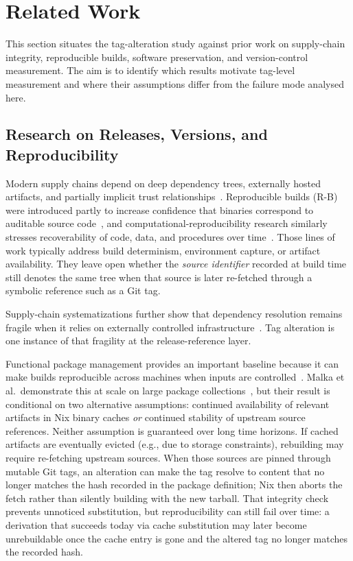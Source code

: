 \section{Related Work}
\label{sec:tags-related}

This section situates the tag-alteration study against prior work on supply-chain integrity, reproducible builds, software preservation, and version-control measurement.
The aim is to identify which results motivate tag-level measurement and where their assumptions differ from the failure mode analysed here.

\subsection{Research on Releases, Versions, and Reproducibility}
\label{subsec:tags-rw-releases}

Modern supply chains depend on deep dependency trees, externally hosted artifacts, and partially implicit trust relationships~\cite{ladisa2023supplychain, DBLP:journals/software/LambZ22, 10.1145/3641525.3663622}.
Reproducible builds (R-B) were introduced partly to increase confidence that binaries correspond to auditable source code~\cite{DBLP:journals/software/LambZ22}, and computational-reproducibility research similarly stresses recoverability of code, data, and procedures over time~\cite{881708, DBLP:journals/corr/abs-2011-10098, DBLP:journals/jodl/AustinBDKMNRSTV17}.
Those lines of work typically address build determinism, environment capture, or artifact availability.
They leave open whether the \emph{source identifier} recorded at build time still denotes the same tree when that source is later re-fetched through a symbolic reference such as a Git tag.

Supply-chain systematizations further show that dependency resolution remains fragile when it relies on externally controlled infrastructure~\cite{ladisa2023supplychain}.
Tag alteration is one instance of that fragility at the release-reference layer.

Functional package management provides an important baseline because it can make builds reproducible across machines when inputs are controlled~\cite{DBLP:conf/lisa/DolstraJV04}.
Malka et al.~demonstrate this at scale on large package collections~\cite{DBLP:conf/msr/MalkaZZ25}, but their result is conditional on two alternative assumptions: continued availability of relevant artifacts in Nix binary caches \emph{or} continued stability of upstream source references.
Neither assumption is guaranteed over long time horizons.
If cached artifacts are eventually evicted (e.g., due to storage constraints), rebuilding may require re-fetching upstream sources.
When those sources are pinned through mutable Git tags, an alteration can make the tag resolve to content that no longer matches the hash recorded in the package definition; Nix then aborts the fetch rather than silently building with the new tarball.
That integrity check prevents unnoticed substitution, but reproducibility can still fail over time: a derivation that succeeds today via cache substitution may later become unrebuildable once the cache entry is gone and the altered tag no longer matches the recorded hash.

